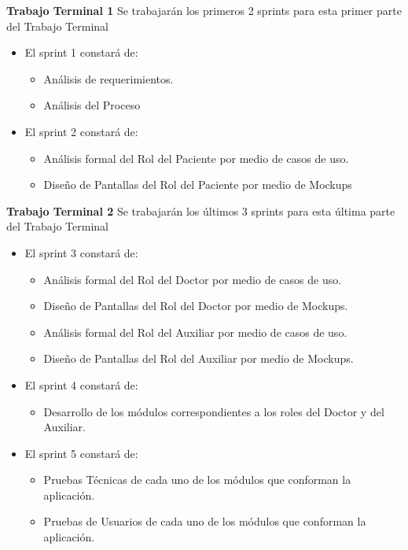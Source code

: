 \textbf{Trabajo Terminal 1}
Se trabajarán los primeros 2 sprints para esta primer parte del Trabajo Terminal
\begin{itemize}
	 
	\item El sprint 1 constará de:
	\begin{itemize}
		\item Análisis de requerimientos.
		\item Análisis del Proceso
	\end{itemize}
	
	\item El sprint 2 constará de:
	\begin{itemize}
		\item Análisis formal del Rol del Paciente por medio de casos de uso.
		\item Diseño de Pantallas del Rol del Paciente por medio de Mockups
	\end{itemize}
\end{itemize}

\textbf{Trabajo Terminal 2}
Se trabajarán los últimos 3 sprints para esta última parte del Trabajo Terminal

\begin{itemize}
	\item El sprint 3 constará de:
	\begin{itemize}
		\item Análisis formal del Rol del Doctor por medio de casos de uso.
		\item Diseño de Pantallas del Rol del Doctor por medio de Mockups.
		\item Análisis formal del Rol del Auxiliar por medio de casos de uso.
		\item Diseño de Pantallas del Rol del Auxiliar por medio de Mockups.
	\end{itemize}
	\item El sprint 4 constará de:
	\begin{itemize}
		\item Desarrollo de los módulos correspondientes a los roles del Doctor y del Auxiliar.
	\end{itemize}
	\item El sprint 5 constará de:
	\begin{itemize}
		\item Pruebas Técnicas de cada uno de los módulos que conforman la aplicación.
		\item Pruebas de Usuarios de cada uno de los módulos que conforman la aplicación.
	\end{itemize}
\end{itemize}

